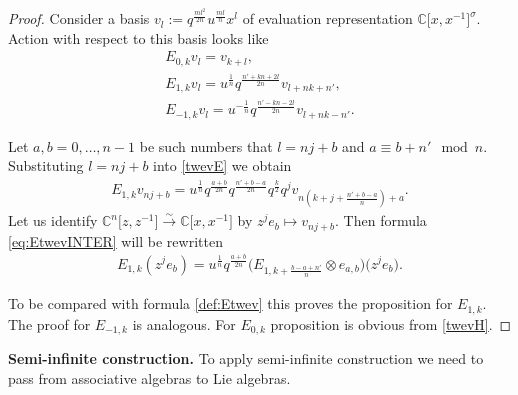\documentclass[pdftex]{sigma}
\numberwithin{equation}{section}
\theoremstyle{definition}
\begin{document}
\begin{proof}

Consider a basis $v_l := q^{\frac{m l^2}{2n}} u^{ \frac{ml}{n} } x^l$ of evaluation representation $\mathbb{C}\big[x, x^{-1}\big]^{\sigma}$\!. Action with respect to this basis looks like
\begin{gather}
E_{0,k} v_l = v_{k+l}, \label{twevH} \\
E_{1,k} v_l = u^{\frac{1}{n}} q^{\frac{n'+kn+2l}{2n}} v_{l + nk + n'}, \label{twevE}\\
E_{-1,k} v_l = u^{-\frac{1}{n}} q^{\frac{n' - kn -2l}{2n}} v_{l+nk-n'}.\nonumber
\end{gather}

Let $a,b =0, \dots, n-1$ be such numbers that $l=nj+b$ and $a \equiv b + n' \mod{n}$. Substituting $l=nj+b$ into \eqref{twevE} we obtain
\begin{gather}
E_{1,k} v_{nj+b} = u^{\frac{1}{n}} q^{\frac{a+b}{2n}} q^{\frac{n'+b-a}{2n}} q^{\frac{k}{2}} q^j v_{n(k+j + \frac{n'+b-a}{n} ) + a}. \label{eq:EtwevINTER}
\end{gather}
Let us identify $\mathbb{C}^n \big[z, z^{-1}\big] \xrightarrow{\sim} \mathbb{C}\big[x,x^{-1}\big] $ by $z^j e_b \mapsto v_{nj+b}$. Then formula \eqref{eq:EtwevINTER} will be rewritten
\begin{gather*}
E_{1,k} (z^j e_b) = u^{\frac{1}{n}} q^{\frac{a+b}{2n}} \big( E_{1, k+ \frac{b-a+n'}{n}} \otimes e_{a,b} \big) \big( z^j e_b \big).
\end{gather*}

To be compared with formula \eqref{def:Etwev} this proves the proposition for $E_{1,k}$. The proof for $E_{-1,k}$ is analogous. For $E_{0,k}$ proposition is obvious from \eqref{twevH}.
\end{proof}

{\bf Semi-infinite construction.} To apply semi-infinite construction we need to pass from associative algebras to Lie algebras.
\end{document}
